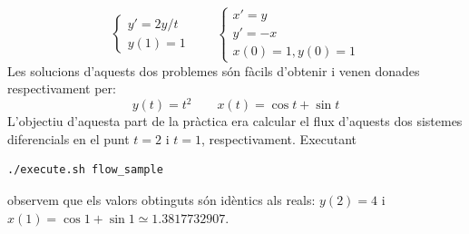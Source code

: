 \documentclass[10pt,a4paper]{article}
\theoremstyle{definition}
\theoremstyle{remark}
\begin{document}
$$
  \begin{cases}
    y'=2 y/t \\
    y(1)=1
  \end{cases}\qquad
  \begin{cases}
    x'=y  \\
    y'=-x \\
    x(0)=1, y(0)=1
  \end{cases}
$$
Les solucions d'aquests dos problemes són fàcils d'obtenir i venen donades respectivament per:
$$
  y(t)=t^2\qquad x(t)=\cos t + \sin t
$$
L'objectiu d'aquesta part de la pràctica era calcular el flux d'aquests dos sistemes diferencials en el punt $t=2$ i $t=1$, respectivament. Executant
\begin{lstlisting}[language=Bash]
./execute.sh flow_sample
\end{lstlisting}
observem que els valors obtinguts són idèntics als reals: $y(2)=4$ i $x(1)=\cos 1 + \sin 1\simeq 1.3817732907$.
\end{document}
